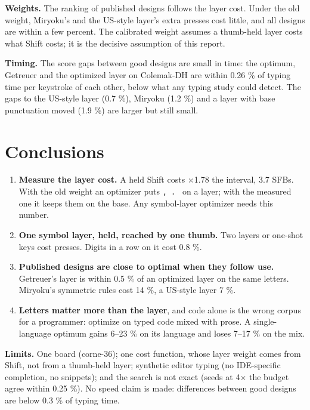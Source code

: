 \documentclass{gecko-paper}
\begin{document}
{\textbf{Weights.} The ranking of published designs follows the layer cost. Under the old weight, Miryoku's and the US-style layer's extra presses cost little, and all designs are within a few percent. The calibrated weight assumes a thumb-held layer costs what Shift costs; it is the decisive assumption of this report.

\textbf{Timing.} The score gaps between good designs are small in time: the optimum, Getreuer and the optimized layer on Colemak-DH are within 0.26 \% of typing time per keystroke of each other, below what any typing study could detect. The gaps to the US-style layer (0.7 \%), Miryoku (1.2 \%) and a layer with base punctuation moved (1.9 \%) are larger but still small.

\section{Conclusions}

\begin{enumerate}
\def\labelenumi{\arabic{enumi}.}
\setlength{\itemsep}{1pt}\setlength{\parskip}{0pt}
\item
  \textbf{Measure the layer cost.} A held Shift costs $\times$1.78 the interval, 3.7 SFBs. With the old weight an optimizer puts \texttt{,\ .\ \textquotesingle{}} on a layer; with the measured one it keeps them on the base. Any symbol-layer optimizer needs this number.
\item
  \textbf{One symbol layer, held, reached by one thumb.} Two layers or one-shot keys cost presses. Digits in a row on it cost 0.8 \%.
\item
  \textbf{Published designs are close to optimal when they follow use.} Getreuer's layer is within 0.5 \% of an optimized layer on the same letters. Miryoku's symmetric rules cost 14 \%, a US-style layer 7 \%.
\item
  \textbf{Letters matter more than the layer}, and code alone is the wrong corpus for a programmer: optimize on typed code mixed with prose. A single-language optimum gains 6–23 \% on its language and loses 7–17 \% on the mix.
\end{enumerate}

\textbf{Limits.} One board (corne-36); one cost function, whose layer weight comes from Shift, not from a thumb-held layer; synthetic editor typing (no IDE-specific completion, no snippets); and the search is not exact (seeds at 4$\times$ the budget agree within 0.25 \%). No speed claim is made: differences between good designs are below 0.3 \% of typing time.

}
\end{document}
